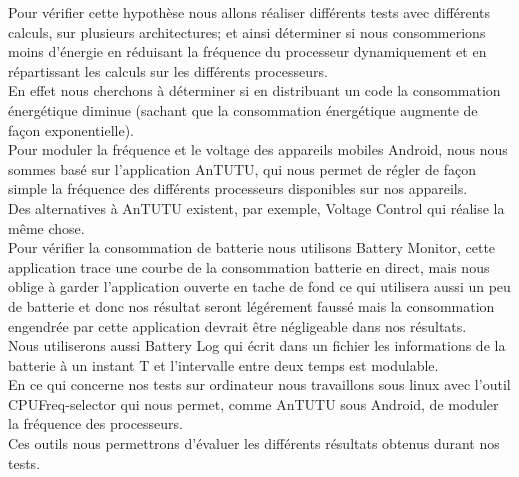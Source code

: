 	Pour vérifier cette hypothèse nous allons réaliser différents tests avec différents calculs, sur plusieurs architectures; et ainsi déterminer si nous consommerions moins d'énergie en réduisant la fréquence du processeur dynamiquement et en répartissant les calculs sur les différents processeurs.\\

	En effet nous cherchons à déterminer si en distribuant un code la consommation énergétique diminue (sachant que la consommation énergétique augmente de façon exponentielle).\\

	Pour moduler la fréquence et le voltage des appareils mobiles Android, nous nous sommes basé sur l'application AnTUTU\cite{ref20}, qui nous permet de régler de façon simple la fréquence des différents processeurs disponibles sur nos appareils.\\

	Des alternatives à AnTUTU existent, par exemple, Voltage Control\cite{ref21} qui réalise la même chose. \\

	Pour vérifier la consommation de batterie nous utilisons Battery Monitor\cite{ref22}, cette application trace une courbe de la consommation batterie en direct, mais nous oblige à garder l'application ouverte en tache de fond ce qui utilisera aussi un peu de batterie et donc nos résultat seront légérement faussé mais la consommation engendrée par cette application devrait être négligeable dans nos résultats. \\

	Nous utiliserons aussi Battery Log\cite{ref23} qui écrit dans un fichier les informations de la batterie à un instant T et l'intervalle entre deux temps est modulable.\\

	En ce qui concerne nos tests sur ordinateur nous travaillons sous linux avec l'outil CPUFreq-selector\cite{ref24} qui nous permet, comme AnTUTU sous Android, de moduler la fréquence des processeurs.\\

	Ces outils nous permettrons d'évaluer les différents résultats obtenus durant nos tests.
